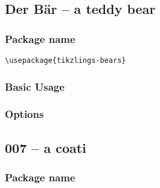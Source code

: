 \documentclass[parskip=half]{scrartcl}
\begin{document}
\begin{tcblisting}{}
\bear[body=SteelBlue]
\end{tcblisting}

\begin{tcblisting}{}
\bear[3D]
\end{tcblisting}


\subsection{Der B\"ar -- a teddy bear}

\subsubsection{Package name}

\begin{tcolorbox}
\vspace*{0.5cm}
\lstinline|\usepackage{tikzlings-bears}|
\vspace*{0.5cm}
\end{tcolorbox}

\subsubsection{Basic Usage}

\begin{tcblisting}{}
\bear
\end{tcblisting}

\subsubsection{Options}

\begin{tcblisting}{}
\bear[body=SteelBlue]
\end{tcblisting}

\begin{tcblisting}{}
\bear[3D]
\end{tcblisting}


\clearpage
\subsection{007 -- a coati}

\subsubsection{Package name}
\end{document}
